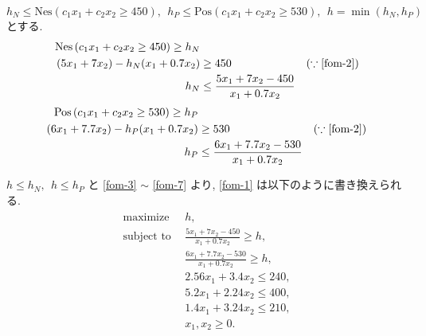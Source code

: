 \documentclass[uplatex, a4j, 11pt, fleqn, dvipdfmx]{article}
\begin{document}
$h_N \leq \mathrm{Nes} \left( c_1 x_1 + c_2 x_2 \geq 450 \right), ~~ h_P \leq \mathrm{Pos} \left( c_1 x_1 + c_2 x_2 \geq 530 \right), ~~ h = \min(h_N, h_P)$ とする.
\begin{align}
	\mathrm{Nes} \left( c_1 x_1 + c_2 x_2 \geq 450 \right) \geq h_N
	\nonumber                                                                              \\
	(5 x_1 + 7 x_2) - h_N (x_1 + 0.7 x_2) & \geq 450
	                                      & \left( \because \eqref{fom-2} \right)
	\nonumber                                                                              \\
	h_N                                   & \leq \frac{5 x_1 + 7 x_2 - 450}{x_1 + 0.7 x_2}
	\label{fom-6}
\end{align}
\begin{align}
	\mathrm{Pos} \left( c_1 x_1 + c_2 x_2 \geq 530 \right) \geq h_P
	\nonumber                                                                                  \\
	(6 x_1 + 7.7 x_2) - h_P (x_1 + 0.7 x_2) & \geq 530
	                                        & \left( \because \eqref{fom-2} \right)
	\nonumber                                                                                  \\
	h_P                                     & \leq \frac{6 x_1 + 7.7 x_2 - 530}{x_1 + 0.7 x_2}
	\label{fom-7}
\end{align}

$h \leq h_N, ~~ h \leq h_P$ と \eqref{fom-3} $\sim$ \eqref{fom-7} より, \eqref{fom-1} は以下のように書き換えられる.
\begin{align}
	\begin{aligned}
		\text{maximize} ~~
		 & h,
		\\
		\text{subject to} ~~
		 & \frac{5 x_1 + 7 x_2 - 450}{x_1 + 0.7 x_2} \geq h,
		\\
		 & \frac{6 x_1 + 7.7 x_2 - 530}{x_1 + 0.7 x_2} \geq h,
		\\
		 & 2.56 x_1 + 3.4 x_2 \leq 240,
		\\
		 & 5.2 x_1 + 2.24 x_2 \leq 400,
		\\
		 & 1.4 x_1 + 3.24 x_2 \leq 210,
		\\
		 & x_1, x_2 \geq 0.
	\end{aligned}
	\label{fom-8}
\end{align}
\end{document}

